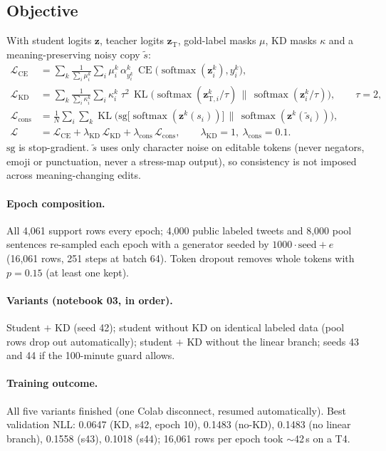 \documentclass[11pt,a4paper]{article}
\theoremstyle{remark}
\newcommand{\z}{\bm{z}}
\DeclareMathOperator{\softmax}{softmax}
\DeclareMathOperator{\CE}{CE}
\DeclareMathOperator{\KL}{KL}
\begin{document}
\subsection{Objective}
With student logits $\z$, teacher logits $\z_{\text{T}}$, gold-label masks $\mu$, KD masks $\kappa$ and a meaning-preserving noisy copy $\tilde s$:
\begin{align}
  \mathcal{L}_{\text{CE}} &= \sum_{k} \frac{1}{\sum_i\mu^k_i}\sum_i \mu^k_i\,\alpha^k_{y^k_i}\,\CE\big(\softmax(\z^k_i), y^k_i\big), \\
  \mathcal{L}_{\text{KD}} &= \sum_{k} \frac{1}{\sum_i\kappa^k_i}\sum_i \kappa^k_i\; \tau^2\,\KL\Big(\softmax(\z^k_{\text{T},i}/\tau)\,\Big\|\,\softmax(\z^k_i/\tau)\Big),\qquad \tau = 2, \\
  \mathcal{L}_{\text{cons}} &= \frac{1}{N}\sum_i\sum_k \KL\Big(\mathrm{sg}\big[\softmax(\z^k(s_i))\big]\,\Big\|\,\softmax(\z^k(\tilde s_i))\Big), \\
  \mathcal{L} &= \mathcal{L}_{\text{CE}} + \lambda_{\text{KD}}\,\mathcal{L}_{\text{KD}} + \lambda_{\text{cons}}\,\mathcal{L}_{\text{cons}},\qquad \lambda_{\text{KD}}=1,\ \lambda_{\text{cons}}=0.1 .
\end{align}
$\mathrm{sg}$ is stop-gradient. $\tilde s$ uses only character noise on editable tokens (never negators, emoji or punctuation, never a stress-map output), so consistency is not imposed across meaning-changing edits.

\paragraph{Epoch composition.} All 4{,}061 support rows every epoch; 4{,}000 public labeled tweets and 8{,}000 pool sentences re-sampled each epoch with a generator seeded by $1000\cdot\text{seed}+e$ (16{,}061 rows, 251 steps at batch 64). Token dropout removes whole tokens with $p=0.15$ (at least one kept).

\paragraph{Variants (notebook 03, in order).} Student $+$ KD (seed 42); student without KD on identical labeled data (pool rows drop out automatically); student $+$ KD without the linear branch; seeds 43 and 44 if the 100-minute guard allows.

\paragraph{Training outcome.} All five variants finished (one Colab disconnect, resumed automatically). Best validation NLL: 0.0647 (KD, s42, epoch 10), 0.1483 (no-KD), 0.1483 (no linear branch), 0.1558 (s43), 0.1018 (s44); 16{,}061 rows per epoch took $\sim$42\,s on a T4.
\end{document}
